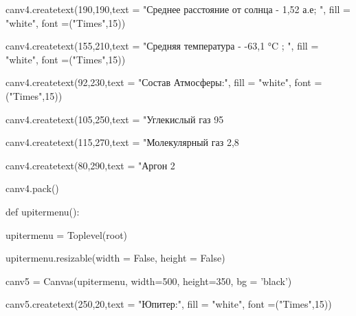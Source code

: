 \documentclass[14pt, oneside]{SavkinSeliverstov}
\begin{document}
	canv\underline{\hspace{0.2cm}}4.create\underline{\hspace{0.2cm}}text(190,190,text = "Среднее расстояние от солнца - 1,52 а.е; ", fill = "white", font =("Times",15))

	canv\underline{\hspace{0.2cm}}4.create\underline{\hspace{0.2cm}}text(155,210,text = "Средняя температура - -63,1 °C ; ", fill = "white", font =("Times",15))

	canv\underline{\hspace{0.2cm}}4.create\underline{\hspace{0.2cm}}text(92,230,text = "Состав Атмосферы:", fill = "white", font =("Times",15))
	
	canv\underline{\hspace{0.2cm}}4.create\underline{\hspace{0.2cm}}text(105,250,text = "Углекислый газ 95%
	
	canv\underline{\hspace{0.2cm}}4.create\underline{\hspace{0.2cm}}text(115,270,text = "Молекулярный газ 2,8%
	
	canv\underline{\hspace{0.2cm}}4.create\underline{\hspace{0.2cm}}text(80,290,text = "Аргон 2%

	canv\underline{\hspace{0.2cm}}4.pack()

def upiter\underline{\hspace{0.2cm}}menu():

	upiter\underline{\hspace{0.2cm}}menu = Toplevel(root)
	
	upiter\underline{\hspace{0.2cm}}menu.resizable(width = False, height = False)
	
	canv\underline{\hspace{0.2cm}}5 = Canvas(upiter\underline{\hspace{0.2cm}}menu, width=500, height=350, bg = 'black')

	canv\underline{\hspace{0.2cm}}5.create\underline{\hspace{0.2cm}}text(250,20,text = "Юпитер:", fill = "white", font =("Times",15))
\end{document}
